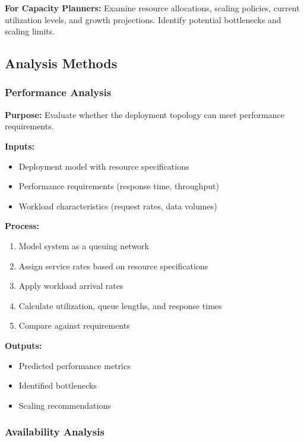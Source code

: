 \documentclass[11pt,letterpaper]{article}
\begin{document}
\textbf{For Capacity Planners:}
Examine resource allocations, scaling policies, current utilization levels, and growth projections. Identify potential bottlenecks and scaling limits.

\subsection{Analysis Methods}

\subsubsection{Performance Analysis}

\begin{definitionbox}
\textbf{Purpose:} Evaluate whether the deployment topology can meet performance requirements.

\textbf{Inputs:}
\begin{itemize}[nosep]
    \item Deployment model with resource specifications
    \item Performance requirements (response time, throughput)
    \item Workload characteristics (request rates, data volumes)
\end{itemize}

\textbf{Process:}
\begin{enumerate}[nosep]
    \item Model system as a queuing network
    \item Assign service rates based on resource specifications
    \item Apply workload arrival rates
    \item Calculate utilization, queue lengths, and response times
    \item Compare against requirements
\end{enumerate}

\textbf{Outputs:}
\begin{itemize}[nosep]
    \item Predicted performance metrics
    \item Identified bottlenecks
    \item Scaling recommendations
\end{itemize}
\end{definitionbox}

\subsubsection{Availability Analysis}
\end{document}
